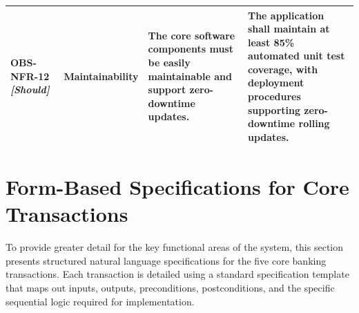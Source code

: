 \documentclass[11pt,a4paper]{article}
\begin{document}
\begin{table}[H]
\begin{tabular}{p{2.0cm} p{2.2cm} p{3.8cm} p{5.4cm}}
\textbf{OBS-NFR-12} \newline \textit{\small [Should]} & Maintainability & The core software components must be easily maintainable and support zero-downtime updates. & The application \textbf{shall} maintain at least 85\% automated unit test coverage, with deployment procedures supporting zero-downtime rolling updates. \\ \bottomrule
\end{tabular}
\end{table}

\newpage

\section{Form-Based Specifications for Core Transactions}
To provide greater detail for the key functional areas of the system, this section presents structured natural language specifications for the five core banking transactions. Each transaction is detailed using a standard specification template that maps out inputs, outputs, preconditions, postconditions, and the specific sequential logic required for implementation.

\end{document}
